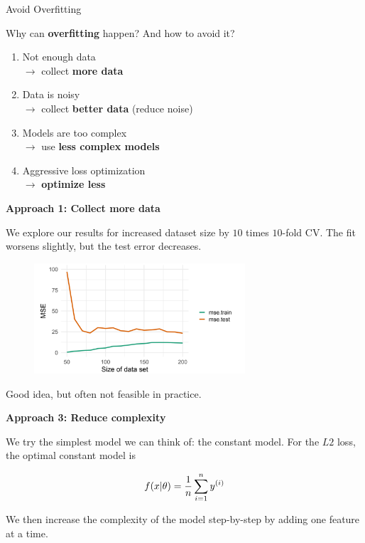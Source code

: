 \begin{vbframe}{Avoid Overfitting} 

Why can \textbf{overfitting} happen? And how to avoid it?

\begin{enumerate}
\item Not enough data \\
$\to$ collect \textbf{more data} 
\item Data is noisy \\
$\to$ collect \textbf{better data} (reduce noise) 
\item Models are too complex \\
$\to$ use \textbf{less complex models}
\item Aggressive loss optimization \\
$\to$ \textbf{optimize less}
\end{enumerate}


\framebreak 

\textbf{Approach 1: Collect more data}

\lz 

We explore our results for increased dataset size by $10$ times $10$-fold CV.
The fit worsens slightly, but the test error decreases.

\begin{figure}
\includegraphics[width=0.7\textwidth]{figure_man/avoid-overfitting01.png}\\
\end{figure}

Good idea, but often not feasible in practice.

\framebreak

\textbf{Approach 3: Reduce complexity}

\lz 

We try the simplest model we can think of: the constant model. For the $L2$ loss, the optimal constant model is

$$
f(x | \theta) = \frac{1}{n}\sum_{i=1}^n y^{(i)}
$$

We then increase the complexity of the model step-by-step by adding one feature at a time.


\end{vbframe}
